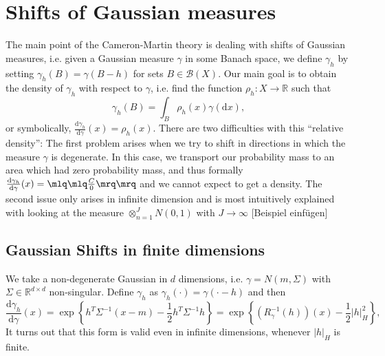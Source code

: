 \documentclass{scrartcl}
\theoremstyle{definition}
\theoremstyle{remark}
\newcommand{\de}{\mathrm d}
\newcommand{\R}{\mathbb R}
\newcommand{\ednote}[1]{{\color{red}[#1]}}
\DeclareRobustCommand{\myboxtwo}[2][blue!20]{%
\begin{tcolorbox}[   %
        breakable,
        left=0pt,
        right=0pt,
        top=0pt,
        bottom=0pt,
        colback=#1,
        colframe=#1,
        width=\dimexpr\textwidth\relax, 
        enlarge left by=0mm,
        boxsep=5pt,
        arc=10pt,outer arc=10pt,
        ]
        #2
\end{tcolorbox}
}
\begin{document}
\section{Shifts of Gaussian measures}
The main point of the Cameron-Martin theory is dealing with shifts of Gaussian measures, i.e. given a Gaussian measure $\gamma$ in some Banach space, we define $\gamma_h$ by setting $\gamma_h(B) = \gamma(B-h)$ for sets $B\in \mathcal B(X)$. Our main goal is to obtain the density of $\gamma_h$ with respect to $\gamma$, i.e. find the function $\rho_h: X\to \R$ such that 
\[\gamma_h(B) = \int_B \rho_h(x) \gamma(\de x),\]
or symbolically, $\frac{\de \gamma_h}{\de \gamma}(x) = \rho_h(x)$.
 There are two difficulties with this ``relative density'': The first problem arises when we try to shift in directions in which the measure $\gamma$ is degenerate. In this case, we transport our probability mass to an area which had zero probability mass, and thus formally $\frac{\de \gamma_h}{\de \gamma}(x) = \mlq\mlq\frac{C}{0}\mrq\mrq$ and we cannot expect to get a density. 
 The second issue only arises in infinite dimension and is most intuitively explained with looking at the measure $\otimes_{n=1}^J N(0,1)$ with $J\to \infty$ \ednote{Beispiel einfügen}
\myboxtwo{
\subsection*{Gaussian Shifts in finite dimensions}
We take a non-degenerate Gaussian in $d$ dimensions, i.e. $\gamma = N(m, \Sigma)$ with $\Sigma\in \R^{d\times d}$ non-singular. Define $\gamma_h$ as $\gamma_h(\cdot) = \gamma(\cdot - h)$ and then
\begin{displaymath}
\frac{\de \gamma_h}{\de \gamma}(x) = \exp\left\{h^T\Sigma^{-1}(x-m) - \frac{1}{2}h^T\Sigma^{-1}h\right\} = \exp\left\{(R_\gamma^{-1}(h))(x) - \frac{1}{2}|h|_H^2\right\},
\end{displaymath}
It turns out that this form is valid even in infinite dimensions, whenever $|h|_H$ is finite.
} 
\end{document}
